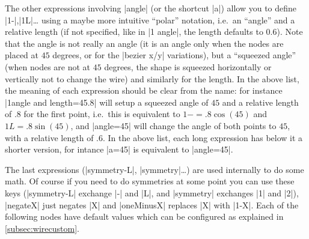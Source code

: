 \documentclass[a4paper,doc2]{ltxdoc} %
\begin{document}
{\begin{pgfmanualentry}
  The other expressions involving |angle| (or the shortcut |a|) allow you to define |1-|,|1L|\dots{} using a maybe more intuitive ``polar'' notation, i.e.\ an ``angle'' and a relative length (if not specified, like in |1 angle|, the length defaults to $0.6$). Note that the angle is not really an angle (it is an angle only when the nodes are placed at $45$ degrees, or for the |bezier x/y| variations), but a ``squeezed angle'' (when nodes are not at $45$ degrees, the shape is squeezed horizontally or vertically not to change the wire) and similarly for the length. In the above list, the meaning of each expression should be clear from the name: for instance |1angle and length={45}{.8}| will setup a squeezed angle of $45$ and a relative length of $.8$ for the first point, i.e.\ this is equivalent to $1-=.8\cos(45)$ and $1L=.8\sin(45)$, and |angle=45| will change the angle of both points to $45$, with a relative length of $.6$. In the above list, each long expression has below it a shorter version, for intance |a=45| is equivalent to |angle=45|.

  The last expressions (|symmetry-L|, |symmetry|\dots) are used internally to do some math. Of course if you need to do symmetries at some point you can use these keys (|symmetry-L| exchange |-| and |L|, and |symmetry| exchanges |1| and |2|), |negateX| just negates |X| and |oneMinusX| replaces |X| with |1-X|. Each of the following nodes have default values which can be configured as explained in \cref{subsec:wirecustom}.
\end{pgfmanualentry}

}
\end{document}
